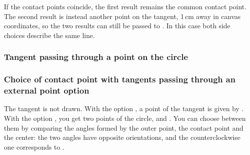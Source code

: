 If the contact points coincide, the first result remains the common contact
point. The second result is instead another point on the tangent, 1\,cm away
in canvas coordinates, so the two results can still be passed to
. In this case both side choices describe the same line.

\begin{tkzexample}[width=0pt,small]
\end{tkzexample}

\subsubsection{Tangent passing through a point on the circle } 
\begin{tkzexample}[latex=7cm,small]
\end{tkzexample}

\subsubsection{Choice of contact point with tangents passing through an external point option } 

The tangent is not drawn. With the option , a point of the tangent is given by . With the option , you get two points of the circle,  and . You can choose between them by comparing the angles formed by the outer point, the contact point and the center: the two angles have opposite orientations, and the counterclockwise one corresponds to .

